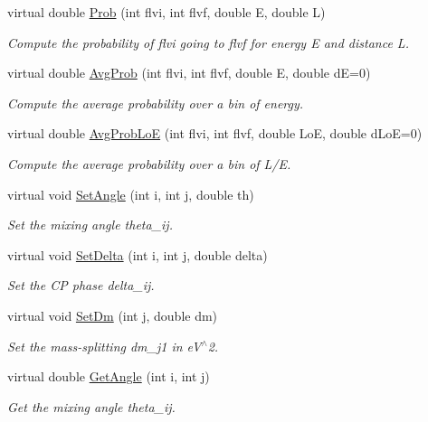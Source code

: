 \begin{DoxyCompactItemize}
virtual double \hyperlink{classOscProb_1_1PMNS__Base_a6e0a74508d9d6db7be02e242b8467563}{Prob} (int flvi, int flvf, double E, double L)
\begin{DoxyCompactList}\small\item\em Compute the probability of flvi going to flvf for energy E and distance L. \end{DoxyCompactList}\item 
virtual double \hyperlink{classOscProb_1_1PMNS__Base_ac03f754160422e6600da8dbae0f803ed}{Avg\+Prob} (int flvi, int flvf, double E, double dE=0)
\begin{DoxyCompactList}\small\item\em Compute the average probability over a bin of energy. \end{DoxyCompactList}\item 
virtual double \hyperlink{classOscProb_1_1PMNS__Base_ac19a92f4ef428a7333ca8eed76fca637}{Avg\+Prob\+LoE} (int flvi, int flvf, double LoE, double d\+LoE=0)
\begin{DoxyCompactList}\small\item\em Compute the average probability over a bin of L/E. \end{DoxyCompactList}\item 
virtual void \hyperlink{classOscProb_1_1PMNS__Base_ace7875cf6d3bec161a2b7ed2690aec34}{Set\+Angle} (int i, int j, double th)
\begin{DoxyCompactList}\small\item\em Set the mixing angle theta\+\_\+ij. \end{DoxyCompactList}\item 
virtual void \hyperlink{classOscProb_1_1PMNS__Base_a4bef78cfcfc4e70b4ce79cdb8862c0a3}{Set\+Delta} (int i, int j, double delta)
\begin{DoxyCompactList}\small\item\em Set the CP phase delta\+\_\+ij. \end{DoxyCompactList}\item 
virtual void \hyperlink{classOscProb_1_1PMNS__Base_a492243b22fb1b783cd2943f507cff970}{Set\+Dm} (int j, double dm)
\begin{DoxyCompactList}\small\item\em Set the mass-\/splitting dm\+\_\+j1 in e\+V$^\wedge$2. \end{DoxyCompactList}\item 
virtual double \hyperlink{classOscProb_1_1PMNS__Base_acee137091304c919642293ddf015bbc8}{Get\+Angle} (int i, int j)
\begin{DoxyCompactList}\small\item\em Get the mixing angle theta\+\_\+ij. \end{DoxyCompactList}\item 

\end{DoxyCompactItemize}
